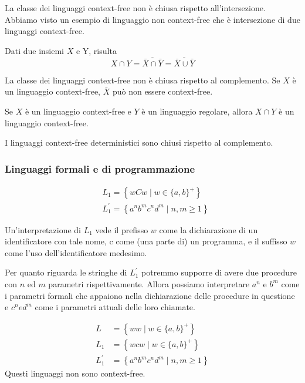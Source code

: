 La classe dei linguaggi context-free non è chiusa rispetto all'intersezione.
Abbiamo visto un esempio di linguaggio non context-free che è intersezione di due linguaggi context-free.

Dati due insiemi $X$ e Y, risulta
$$
X \cap Y=\overline{\bar{X} \cap \bar{Y}}=\overline{\bar{X} \cup \bar{Y}}
$$

La classe dei linguaggi context-free non è chiusa rispetto al complemento.
Se $X$ è un linguaggio context-free, $\bar{X}$ può non essere context-free.

\vspace{5mm}

Se $X$ è un linguaggio context-free e $Y$ è un linguaggio regolare, allora $X \cap Y$ è un linguaggio context-free.

I linguaggi context-free deterministici sono chiusi rispetto al complemento.

\subsubsection{Linguaggi formali e di programmazione}

$$
\begin{aligned}
&L_{1}=\left\{w C w \mid w \in\{a, b\}^{+}\right\} \\
&L_{1}^{\prime}=\left\{a^{n} b^{m} c^{n} d^{m} \mid n, m \geq 1\right\}
\end{aligned}
$$

Un'interpretazione di $L_{1}$ vede il prefisso $w$ come la dichiarazione di un identificatore con tale nome, c come (una parte di) un programma, e il suffisso $w$ come l'uso dell'identificatore medesimo.

Per quanto riguarda le stringhe di $L_{1}^{\prime}$ potremmo supporre di avere due procedure con $n$ ed $m$ parametri rispettivamente. Allora possiamo interpretare $a^{n}$ e $b^{m}$ come i parametri formali che appaiono nella dichiarazione delle procedure in questione e $c^{n} e d^{m}$ come i parametri attuali delle loro chiamate.

\vspace{5mm}

$$
\begin{aligned}
L &=\left\{w w \mid w \in\{a, b\}^{+}\right\} \\
L_{1} &=\left\{w c w \mid w \in\{a, b\}^{+}\right\} \\
L_{1}^{\prime} &=\left\{a^{n} b^{m} c^{n} d^{m} \mid n, m \geq 1\right\}
\end{aligned}
$$
Questi linguaggi non sono context-free.

